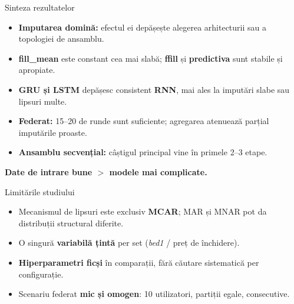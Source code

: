 \documentclass[aspectratio=169, 11pt]{beamer}
\begin{document}
\begin{frame}{Sinteza rezultatelor}
  \begin{itemize}
    \item \textbf{Imputarea domină:} efectul ei depășește alegerea arhitecturii sau a topologiei de ansamblu.
    \item \textbf{fill\_mean} este constant cea mai slabă; \textbf{ffill} și \textbf{predictiva} sunt stabile și apropiate.
    \item \textbf{GRU și LSTM} depășesc consistent \textbf{RNN}, mai ales la imputări slabe sau lipsuri multe.
    \item \textbf{Federat:} 15–20 de runde sunt suficiente; agregarea atenuează parțial imputările proaste.
    \item \textbf{Ansamblu secvențial:} câștigul principal vine în primele 2–3 etape.
  \end{itemize}
  \vfill
  \begin{keybox}
    \centering\large \textbf{Date de intrare bune $>$ modele mai complicate.}
  \end{keybox}
\end{frame}

\begin{frame}{Limitările studiului}
  \begin{itemize}
    \item Mecanismul de lipsuri este exclusiv \textbf{MCAR}; MAR și MNAR pot da distribuții structural diferite.
    \item O singură \textbf{variabilă țintă} per set (\textit{bed1} / preț de închidere).
    \item \textbf{Hiperparametri ficși} în comparații, fără căutare sistematică per configurație.
    \item Scenariu federat \textbf{mic și omogen}: 10 utilizatori, partiții egale, consecutive.
  \end{itemize}
\end{frame}
\end{document}
